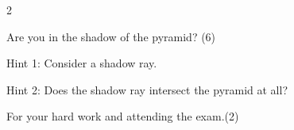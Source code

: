 \documentclass[11pt,answers]{exam}
\begin{document}
\begin{questions}
{\begin{multicols}{2}
\begin{center}
\begin{tikzpicture}
\end{tikzpicture}

\end{center}
\end{multicols}

Are you in the shadow of the pyramid? \hfill (6)
\vspace{0.5cm}

Hint 1: Consider a shadow ray.

Hint 2: Does the shadow ray intersect the pyramid at all?
}
\vspace{14cm}
\question[]For your hard work and attending the exam.\hfill (2)

\end{questions}
\end{document}
